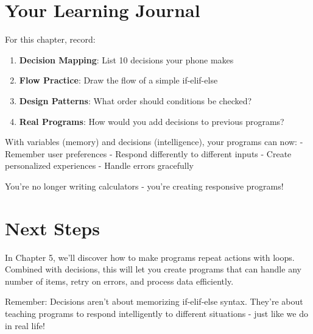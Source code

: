 \documentclass[
  letterpaper,
  DIV=11,
  numbers=noendperiod,
  oneside]{scrreprt}
\providecommand{\tightlist}{%
  \setlength{\itemsep}{0pt}\setlength{\parskip}{0pt}}\usepackage{longtable,booktabs,array}
\begin{document}
\section{Your Learning Journal}\label{your-learning-journal-4}

For this chapter, record:

\begin{enumerate}
\def\labelenumi{\arabic{enumi}.}
\tightlist
\item
  \textbf{Decision Mapping}: List 10 decisions your phone makes
\item
  \textbf{Flow Practice}: Draw the flow of a simple if-elif-else
\item
  \textbf{Design Patterns}: What order should conditions be checked?
\item
  \textbf{Real Programs}: How would you add decisions to previous
  programs?
\end{enumerate}

\begin{tcolorbox}[enhanced jigsaw, opacityback=0, colback=white, colframe=quarto-callout-tip-color-frame, breakable, titlerule=0mm, coltitle=black, rightrule=.15mm, colbacktitle=quarto-callout-tip-color!10!white, left=2mm, bottomtitle=1mm, bottomrule=.15mm, title=\textcolor{quarto-callout-tip-color}{\faLightbulb}\hspace{0.5em}{The Power of Decisions}, opacitybacktitle=0.6, toptitle=1mm, leftrule=.75mm, arc=.35mm, toprule=.15mm]

With variables (memory) and decisions (intelligence), your programs can
now: - Remember user preferences - Respond differently to different
inputs - Create personalized experiences - Handle errors gracefully

You're no longer writing calculators - you're creating responsive
programs!

\end{tcolorbox}

\section{Next Steps}\label{next-steps-4}

In Chapter 5, we'll discover how to make programs repeat actions with
loops. Combined with decisions, this will let you create programs that
can handle any number of items, retry on errors, and process data
efficiently.

Remember: Decisions aren't about memorizing if-elif-else syntax. They're
about teaching programs to respond intelligently to different situations
- just like we do in real life!
\end{document}
